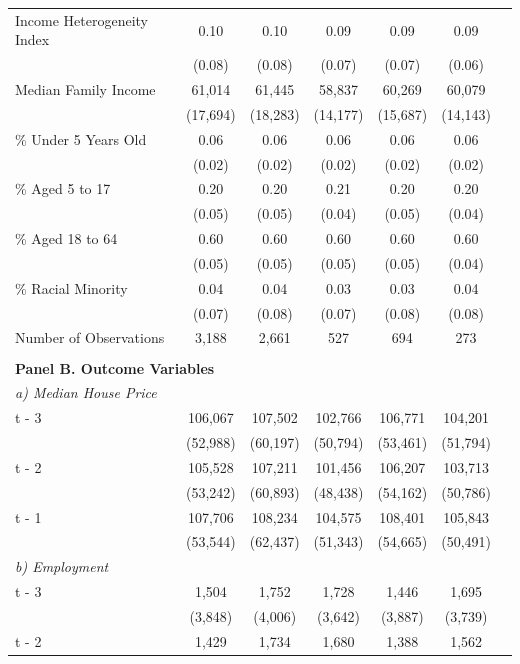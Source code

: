 \begin{longtable}{p{4cm}cccccc}
    Income Heterogeneity Index & 0.10 & 0.10 & 0.09 & 0.09 & 0.09 \\
                               & (0.08) & (0.08) & (0.07) & (0.07) & (0.06) \\
    Median Family Income & 61,014 & 61,445 & 58,837 & 60,269 & 60,079 \\
                         & (17,694) & (18,283) & (14,177) & (15,687) & (14,143) \\
    \% Under 5 Years Old & 0.06 & 0.06 & 0.06 & 0.06 & 0.06 \\
                         & (0.02) & (0.02) & (0.02) & (0.02) & (0.02) \\
    \% Aged 5 to 17 & 0.20 & 0.20 & 0.21 & 0.20 & 0.20 \\
                    & (0.05) & (0.05) & (0.04) & (0.05) & (0.04) \\
    \% Aged 18 to 64 & 0.60 & 0.60 & 0.60 & 0.60 & 0.60 \\
                     & (0.05) & (0.05) & (0.05) & (0.05) & (0.04) \\
    \% Racial Minority & 0.04 & 0.04 & 0.03 & 0.03 & 0.04 \\
                       & (0.07) & (0.08) & (0.07) & (0.08) & (0.08) \\
    Number of Observations & 3,188 & 2,661 & 527 & 694 & 273 \\
    \\
    \multicolumn{6}{l}{\textbf{Panel B. Outcome Variables}} \\
    \textit{a) Median House Price} & & & & & \\
    t - 3 & 106,067 & 107,502 & 102,766 & 106,771 & 104,201 \\
          & (52,988) & (60,197) & (50,794) & (53,461) & (51,794) \\
    t - 2 & 105,528 & 107,211 & 101,456 & 106,207 & 103,713 \\
          & (53,242) & (60,893) & (48,438) & (54,162) & (50,786) \\
    t - 1 & 107,706 & 108,234 & 104,575 & 108,401 & 105,843 \\
          & (53,544) & (62,437) & (51,343) & (54,665) & (50,491) \\
    \textit{b) Employment} & & & & & \\
    t - 3 & 1,504 & 1,752 & 1,728 & 1,446 & 1,695 \\
          & (3,848) & (4,006) & (3,642) & (3,887) & (3,739) \\
    t - 2 & 1,429 & 1,734 & 1,680 & 1,388 & 1,562 \\

\end{longtable}
